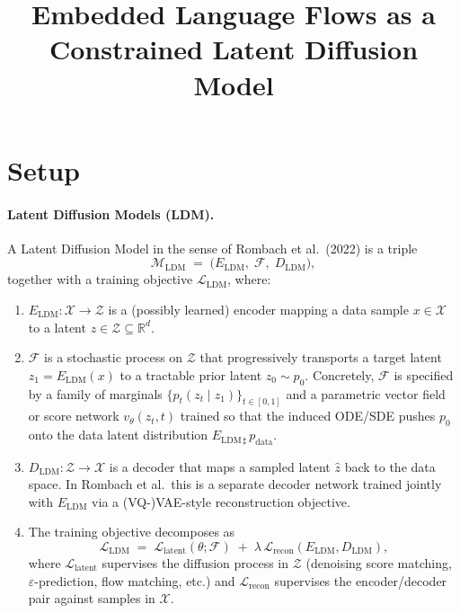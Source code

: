 \documentclass[11pt]{article}
\title{Embedded Language Flows as a Constrained Latent Diffusion Model}
\author{}
\date{}
\begin{document}
\maketitle

\section*{Setup}

\paragraph{Latent Diffusion Models (LDM).}
A Latent Diffusion Model in the sense of Rombach et al.\ (2022) is a triple
\[
  \mathcal{M}_{\mathrm{LDM}} \;=\; \bigl(E_{\mathrm{LDM}},\; \mathcal{F},\; D_{\mathrm{LDM}}\bigr),
\]
together with a training objective $\mathcal{L}_{\mathrm{LDM}}$, where:

\begin{enumerate}
  \item $E_{\mathrm{LDM}}\colon \mathcal{X} \to \mathcal{Z}$ is a (possibly
        learned) encoder mapping a data sample $x\in\mathcal{X}$ to a latent
        $z\in\mathcal{Z}\subseteq\mathbb{R}^{d}$.
  \item $\mathcal{F}$ is a stochastic process on $\mathcal{Z}$ that
        progressively transports a target latent $z_{1}=E_{\mathrm{LDM}}(x)$
        to a tractable prior latent $z_{0}\sim p_{0}$. Concretely, $\mathcal{F}$
        is specified by a family of marginals $\{p_{t}(z_{t}\mid z_{1})\}_{t\in[0,1]}$
        and a parametric vector field or score network
        $v_{\theta}(z_{t},t)$ trained so that the induced ODE/SDE pushes
        $p_{0}$ onto the data latent distribution $E_{\mathrm{LDM}\,\sharp}\,p_{\mathrm{data}}$.
  \item $D_{\mathrm{LDM}}\colon \mathcal{Z} \to \mathcal{X}$ is a decoder that
        maps a sampled latent $\hat z$ back to the data space. In Rombach et
        al.\ this is a separate decoder network trained jointly with
        $E_{\mathrm{LDM}}$ via a (VQ-)VAE-style reconstruction objective.
  \item The training objective decomposes as
        \[
          \mathcal{L}_{\mathrm{LDM}}
          \;=\;
          \mathcal{L}_{\mathrm{latent}}(\theta;\mathcal{F})
          \;+\;
          \lambda \,\mathcal{L}_{\mathrm{recon}}(E_{\mathrm{LDM}}, D_{\mathrm{LDM}}),
        \]
        where $\mathcal{L}_{\mathrm{latent}}$ supervises the diffusion process
        in $\mathcal{Z}$ (denoising score matching, $\varepsilon$-prediction,
        flow matching, etc.) and $\mathcal{L}_{\mathrm{recon}}$ supervises the
        encoder/decoder pair against samples in $\mathcal{X}$.
\end{enumerate}
\end{document}
